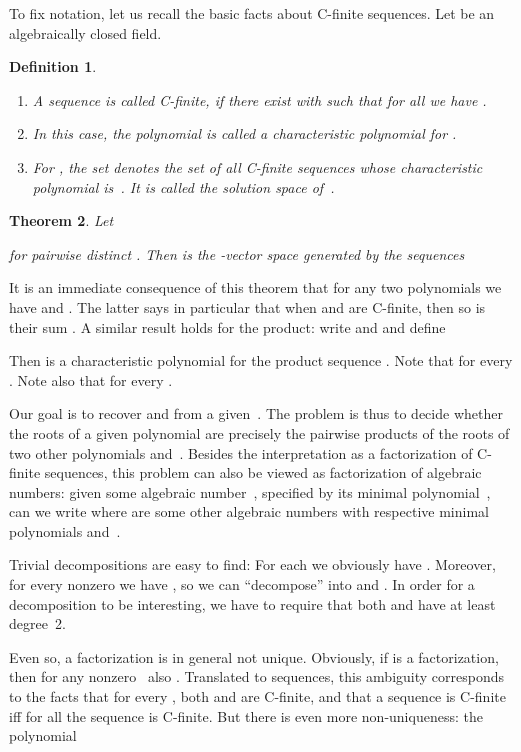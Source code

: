 \documentclass{sig-alternate}
\newtheorem{theorem}{Theorem}
\newtheorem{defi}[theorem]{Definition}
\begin{document}
To fix notation, let us recall the basic facts about C-finite sequences.
Let  be an algebraically closed field. 

\begin{defi}
  \begin{enumerate}
  \item A sequence  is called \emph{C-finite,} if there exist
     with  such that for all  we have
    .
  \item In this case, the polynomial  is called a
    \emph{characteristic polynomial} for .
  \item For , the set  denotes the set of all C-finite sequences
    whose characteristic polynomial is~. It is called the \emph{solution space}
    of~.
  \end{enumerate}  
\end{defi}

\begin{theorem}\cite{stanley99,kauers10j}\label{thm:main}
  Let
  
  for pairwise distinct . Then 
  is the -vector space generated by the sequences
  
\end{theorem}

It is an immediate consequence of this theorem that for any two polynomials 
we have  and . The latter says in
particular that when  and  are C-finite, then so is
their sum . A similar result holds for the product: write
 and  and define

Then  is a characteristic polynomial for the product sequence .
Note that  for every .
Note also that  for every .

Our goal is to recover  and  from a given~.
The problem is thus to decide whether the roots of a given polynomial  are precisely
the pairwise products of the roots of two other polynomials  and~.
Besides the interpretation as a factorization of C-finite sequences, this problem can
also be viewed as factorization of algebraic numbers: given some algebraic number~,
specified by its minimal polynomial~, can we write  where 
are some other algebraic numbers with respective minimal polynomials  and~. 

Trivial decompositions are easy to find: For each  we obviously have .
Moreover, for every nonzero  we have , so we
can ``decompose''  into  and .
In order for a decomposition  to be interesting, we have to require that
both  and  have at least degree~2.

Even so, a factorization is in general not unique. Obviously, if  is a factorization,
then for any nonzero~ also .
Translated to sequences, this ambiguity corresponds to the facts that for every , both
 and  are C-finite, and that a sequence  is C-finite
iff for all  the sequence  is C-finite. 
But there is even more non-uniqueness: the polynomial
\end{document}
